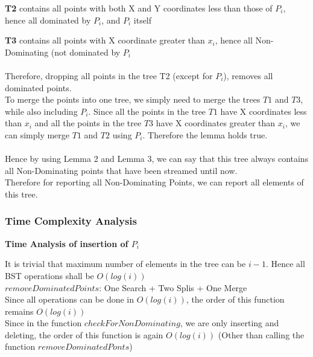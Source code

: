 \documentclass{article}
\begin{document}
                \textbf{T2} contains all points with both X and Y coordinates less than those of $P_i$, hence all dominated by $P_i$, and $P_i$ itself
                
                \textbf{T3} contains all points with X coordinate greater than $x_i$, hence all Non-Dominating (not dominated by $P_i$
                \\
                \\
                Therefore, dropping all points in the tree T2 (except for $P_i$), removes all dominated points.
                \\
                To merge the points into one tree, we simply need to merge the trees $T1$ and $T3$, while also including $P_i$. Since all the points in the tree $T1$ have X coordinates less than $x_i$ and all the points in the tree $T3$ have X coordinates greater than $x_i$, we can simply merge $T1$ and $T2$ using $P_i$. Therefore the lemma holds true.
                \\
                \\
                Hence by using Lemma 2 and Lemma 3, we can say that this tree always contains all Non-Dominating points that have been streamed until now.
                \\
                Therefore for reporting all Non-Dominating Points, we can report all elements of this tree.
                
            \subsubsection*{Time Complexity Analysis}
            
                \textbf{Time Analysis of insertion of $P_i$}
                
                It is trivial that maximum number of elements in the tree can be $i - 1$. Hence all BST operations shall be $O(log(i))$
                \\
                
                \textbf{$removeDominatedPoints$}: One Search + Two Splis + One Merge
                \\
                Since all operations can be done in $O(log(i))$, the order of this function remains $O(log(i))$
                \\
                
                Since in the function $checkForNonDominating$, we are only inserting and deleting, the order of this function is again $O(log(i))$ (Other than calling the function $removeDominatedPonts$)
                \\
                
\end{document}
